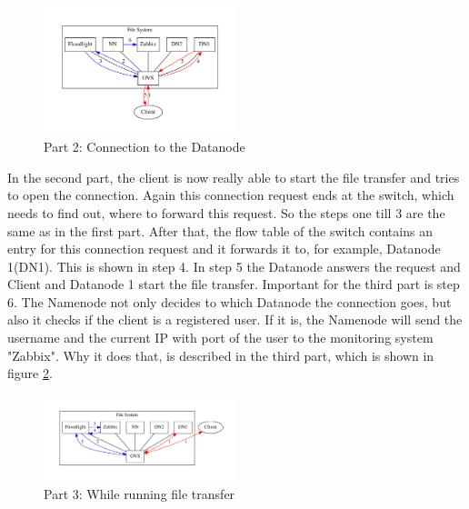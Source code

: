 \begin{figure}[ht]
\centering
\includegraphics[width=0.5\textwidth]{img/connectionToDatanode} 
\caption{Part 2: Connection to the Datanode}
\label{dn}
\end{figure}     

In the second part, the client is now really able to start the file transfer and tries to open the connection. Again this connection request ends at the switch, which needs to find out, where to forward this request. So the steps one till 3 are the same as in the first part. After that, the flow table of the switch contains an entry for this connection request and it forwards it to, for example, Datanode 1(DN1). This is shown in step 4. In step 5 the Datanode answers the request and Client and Datanode 1 start the file transfer. Important for the third part is step 6. The Namenode not only decides to which Datanode the connection goes, but also it checks if the client is a registered user. If it is, the Namenode will send the username and the current IP with port of the user to the monitoring system "Zabbix". Why it does that, is described in the third part, which is shown in figure \ref{wc}.    

\begin{figure}[ht]
\centering
\includegraphics[width=0.5\textwidth]{img/whileConnection} 
\caption{Part 3: While running file transfer}
\label{wc}
\end{figure}

